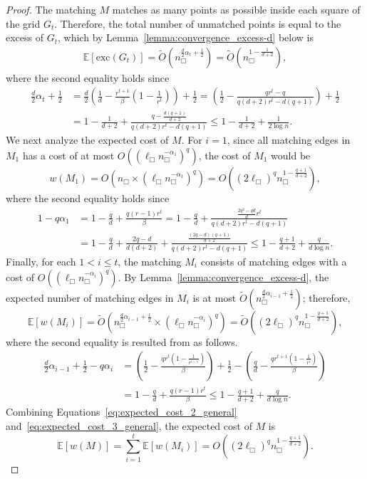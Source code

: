 \documentclass[11pt,onecolumn]{article}
\def\mbE{{\mathbb{E}}}
\newcommand{\cell}{\Box}
\newcommand{\excess}{\mathrm{exc}}
\begin{document}
\begin{proof}
The matching $M$ matches as many points as possible inside each square of the grid $G_t$. Therefore, the total number of unmatched points is equal to the excess of $G_t$, which by Lemma~\ref{lemma:convergence_excess-d} below is 
\begin{align}
    \mbE[\excess(G_t)] = \tilde{O}(n_\cell^{\frac{d}{2}\alpha_t+\frac{1}{2}}) = \tilde{O}(n_\cell^{1 - \frac{1}{d+2}}), \label{eq:expected_free_general}
\end{align}
where the second equality holds since
\begin{align*}
    \frac{d}{2}\alpha_t+\frac{1}{2} &= \frac{d}{2}\left(\frac{1}{d} - \frac{r^{t+1}}{\beta}(1-\frac{1}{r^t}) \right) + \frac{1}{2}= \left(\frac{1}{2} - \frac{qr^{t}-q}{q(d+2)r^t - d(q+1)} \right) + \frac{1}{2}\\ &= 1 - \frac{1}{d+2} + \frac{q-\frac{d(q+1)}{d+2}}{q(d+2)r^t - d(q+1)} \le 1 - \frac{1}{d+2} + \frac{1}{2\log n}. 
\end{align*}
We next analyze the expected cost of $M$. For $i=1$, since all matching edges in $M_1$ has a cost of at most $O((\ell_\cell n_\cell^{-\alpha_1})^q)$, the cost of $M_1$ would be 
\begin{equation}
    w(M_1) = O(n_\cell\times (\ell_\cell n_\cell^{-\alpha_1})^q) = O((2\ell_\cell)^q n_\cell^{1-\frac{q+1}{d+2}}),\label{eq:expected_cost_2_general}
\end{equation}
where the second equality holds since
\begin{align*}
    1-q\alpha_1 &= 1-\frac{q}{d}+\frac{q(r-1)r^t}{\beta}= 1-\frac{q}{d}+\frac{\frac{2q^2-qd}{d}r^t}{q(d+2)r^t - d(q+1)} \\ &= 1-\frac{q}{d}+\frac{2q-d}{d(d+2)} + \frac{\frac{(2q-d)(q+1)}{d+2}}{q(d+2)r^t - d(q+1)}\le 1-\frac{q+1}{d+2} + \frac{q}{d\log n}.
\end{align*}
Finally, for each $1<i\le t$, the matching $M_i$ consists of matching edges with a cost of $O((\ell_\cell n_\cell^{-\alpha_i})^q)$. By Lemma~\ref{lemma:convergence_excess-d}, the expected number of matching edges in $M_i$ is at most $\tilde{O}(n_\cell^{\frac{d}{2}\alpha_{i-1}+\frac{1}{2}})$; therefore,
\begin{equation}
    \mbE[w(M_i)] = \tilde{O}(n_\cell^{\frac{d}{2}\alpha_{i-1}+\frac{1}{2}}\times (\ell_\cell n_\cell^{-\alpha_i})^q) = \tilde{O}((2\ell_\cell)^q n_\cell^{1-\frac{q+1}{d+2}}),\label{eq:expected_cost_3_general}
\end{equation}
where the second equality is resulted from as follows.
\begin{align*}
    \frac{d}{2}\alpha_{i-1} + \frac{1}{2}-q\alpha_i &= \left(\frac{1}{2}-\frac{qr^t(1-\frac{1}{r^{i-1}})}{\beta}\right) + \frac{1}{2} - \left(\frac{q}{d}-\frac{qr^{t+1}(1-\frac{1}{r^{i}})}{\beta}\right)\\ &=  1-\frac{q}{d}+\frac{q(r-1)r^t}{\beta}\le 1-\frac{q+1}{d+2} + \frac{q}{d\log n}.
\end{align*}
Combining Equations~\eqref{eq:expected_cost_2_general} and~\eqref{eq:expected_cost_3_general}, the expected cost of $M$ is \[\mbE[w(M)]=\sum_{i=1}^t\mbE[w(M_i)]=O((2\ell_\cell)^qn_\cell^{1-\frac{q+1}{d+2}}).\]
\end{proof}
\end{document}
